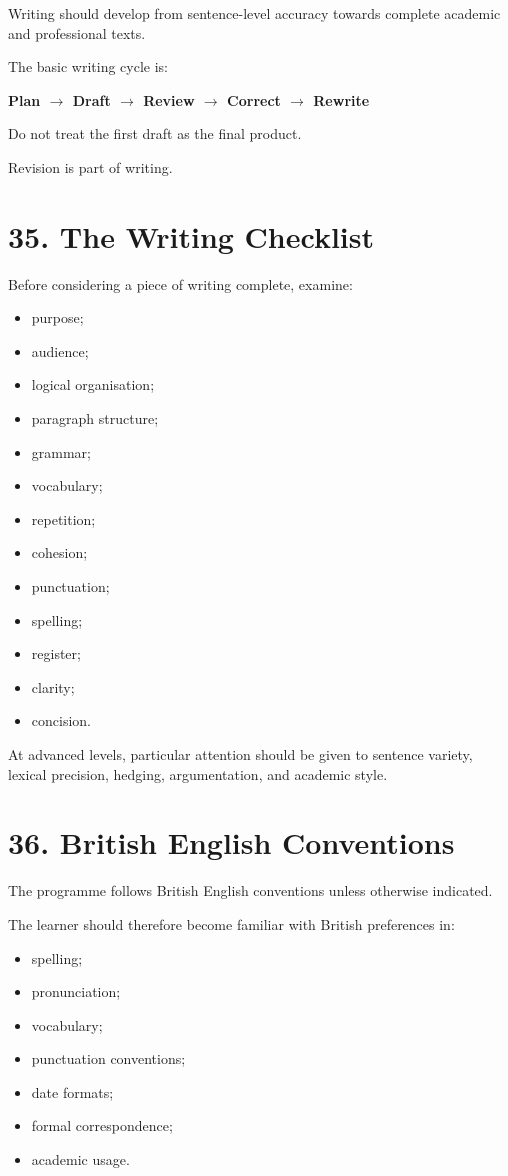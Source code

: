 Writing should develop from sentence-level accuracy towards complete academic and professional texts.

The basic writing cycle is:

\begin{center}
\textbf{Plan $\rightarrow$ Draft $\rightarrow$ Review $\rightarrow$ Correct $\rightarrow$ Rewrite}
\end{center}

Do not treat the first draft as the final product.

Revision is part of writing.

\section*{35. The Writing Checklist}

Before considering a piece of writing complete, examine:

\begin{itemize}
    \item purpose;
    \item audience;
    \item logical organisation;
    \item paragraph structure;
    \item grammar;
    \item vocabulary;
    \item repetition;
    \item cohesion;
    \item punctuation;
    \item spelling;
    \item register;
    \item clarity;
    \item concision.
\end{itemize}

At advanced levels, particular attention should be given to sentence variety, lexical precision, hedging, argumentation, and academic style.

\section*{36. British English Conventions}

The programme follows British English conventions unless otherwise indicated.

The learner should therefore become familiar with British preferences in:

\begin{itemize}
    \item spelling;
    \item pronunciation;
    \item vocabulary;
    \item punctuation conventions;
    \item date formats;
    \item formal correspondence;
    \item academic usage.
\end{itemize}

